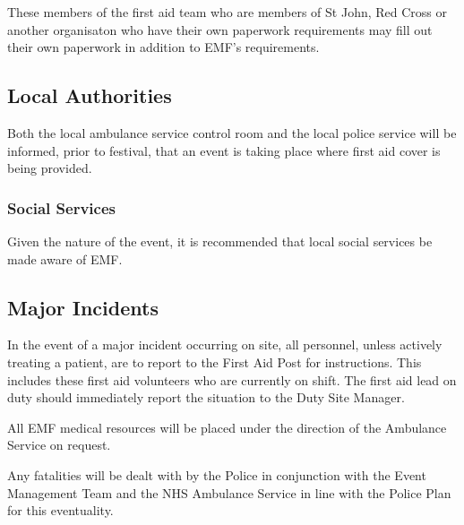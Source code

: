 These members of the first aid team who are members of St John, Red Cross or another
organisaton who have their own paperwork requirements may fill out their own paperwork
in addition to EMF's requirements.

\subsection{Local Authorities}
Both the local ambulance service control room and the local police service will
be informed, prior to festival, that an event is taking place where first aid
cover is being provided.

\subsubsection{Social Services}

Given the nature of the event, it is recommended that local social services be
made aware of EMF.

\subsection{Major Incidents}

In the event of a major incident occurring on site, all personnel, unless
actively treating a patient, are to report to the First Aid Post for
instructions. This includes these first aid volunteers who are currently on
shift. The first aid lead on duty should immediately report the situation to the
Duty Site Manager.

All EMF medical resources will be placed under the direction of the Ambulance
Service on request.

Any fatalities will be dealt with by the Police in conjunction with the Event
Management Team and the NHS Ambulance Service in line with the Police Plan for
this eventuality.
